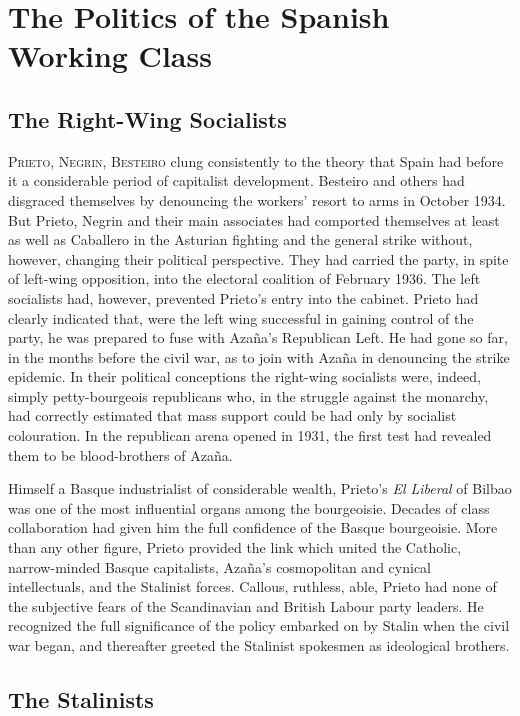 \chapter{The Politics of the Spanish Working Class}

\section{The Right-Wing Socialists}

\textsc{Prieto, Negrin, Besteiro} clung consistently to the theory that Spain had before it a considerable period of capitalist development. Besteiro and others had disgraced themselves by denouncing the workers’ resort to arms in October 1934. But Prieto, Negrin and their main associates had comported themselves at least as well as Caballero in the Asturian fighting and the general strike without, however, changing their political perspective. They had carried the party, in spite of left-wing opposition, into the electoral coalition of February 1936. The left socialists had, however, prevented Prieto’s entry into the cabinet. Prieto had clearly indicated that, were the left wing successful in gaining control of the party, he was prepared to fuse with Azaña’s Republican Left. He had gone so far, in the months before the civil war, as to join with Azaña in denouncing the strike epidemic. In their political conceptions the right-wing socialists were, indeed, simply petty-bourgeois republicans who, in the struggle against the monarchy, had correctly estimated that mass support could be had only by socialist colouration. In the republican arena opened in 1931, the first test had revealed them to be blood-brothers of Azaña.

Himself a Basque industrialist of considerable wealth, Prieto’s \emph{El Liberal} of Bilbao was one of the most influential organs among the bourgeoisie. Decades of class collaboration had given him the full confidence of the Basque bourgeoisie. More than any other figure, Prieto provided the link which united the Catholic, narrow-minded Basque capitalists, Azaña’s cosmopolitan and cynical intellectuals, and the Stalinist forces. Callous, ruthless, able, Prieto had none of the subjective fears of the Scandinavian and British Labour party leaders. He recognized the full significance of the policy embarked on by Stalin when the civil war began, and thereafter greeted the Stalinist spokesmen as ideological brothers.

\section{The Stalinists}

